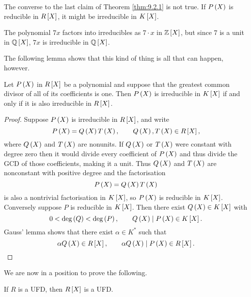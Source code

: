 \begin{note*}
The converse to the last claim of Theorem \ref{thm:9.2.1} is not true. If $ P\rb{X} $ is reducible in $ R\sb{X} $, it might be irreducible in $ K\sb{X} $.
\end{note*}

\begin{example*}
The polynomial $ 7x $ factors into irreducibles as $ 7 \cdot x $ in $ \Z\sb{X} $, but since $ 7 $ is a unit in $ \Q\sb{X} $, $ 7x $ is irreducible in $ \Q\sb{X} $.
\end{example*}

The following lemma shows that this kind of thing is all that can happen, however.

\begin{proposition}
Let $ P\rb{X} $ in $ R\sb{X} $ be a polynomial and suppose that the greatest common divisor of all of its coefficients is one. Then $ P\rb{X} $ is irreducible in $ K\sb{X} $ if and only if it is also irreducible in $ R\sb{X} $.
\end{proposition}

\begin{proof}
Suppose $ P\rb{X} $ is irreducible in $ R\sb{X} $, and write
$$ P\rb{X} = Q\rb{X}T\rb{X}, \qquad Q\rb{X}, T\rb{X} \in R\sb{X}, $$
where $ Q\rb{X} $ and $ T\rb{X} $ are nonunits. If $ Q\rb{X} $ or $ T\rb{X} $ were constant with degree zero then it would divide every coefficient of $ P\rb{X} $ and thus divide the GCD of those coefficients, making it a unit. Thus $ Q\rb{X} $ and $ T\rb{X} $ are nonconstant with positive degree and the factorisation
$$ P\rb{X} = Q\rb{X}T\rb{X} $$
is also a nontrivial factorisation in $ K\sb{X} $, so $ P\rb{X} $ is reducible in $ K\sb{X} $. Conversely suppose $ P $ is reducible in $ K\sb{X} $. Then there exist $ Q\rb{X} \in K\sb{X} $ with
$$ 0 < \deg\rb{Q} < \deg\rb{P}, \qquad Q\rb{X} \mid P\rb{X} \in K\sb{X}. $$
Gauss' lemma shows that there exist $ \alpha \in K^* $ such that
$$ \alpha Q\rb{X} \in R\sb{X}, \qquad \alpha Q\rb{X} \mid P\rb{X} \in R\sb{X}. $$
\end{proof}

\pagebreak

We are now in a position to prove the following.

\begin{theorem}
If $ R $ is a UFD, then $ R\sb{X} $ is a UFD.
\end{theorem}

